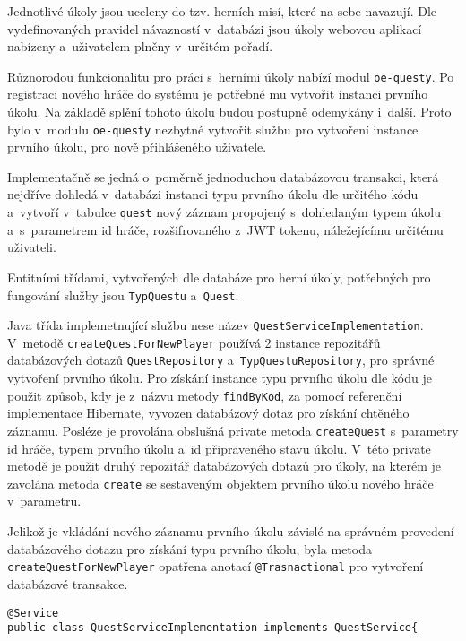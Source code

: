 \documentclass[12pt]{article}
\begin{document}
{Jednotlivé úkoly jsou uceleny do tzv. herních misí, které na sebe navazují. 
Dle vydefinovaných pravidel návazností v~databázi jsou úkoly webovou aplikací nabízeny 
a~uživatelem plněny v~určitém pořadí.

Různorodou funkcionalitu pro práci s~herními úkoly nabízí modul \texttt{oe-questy}.
Po registraci nového hráče do systému je potřebné mu vytvořit instanci prvního úkolu. 
Na základě splění tohoto úkolu budou postupně odemykány i~další. 
Proto bylo v~modulu \texttt{oe-questy} nezbytné vytvořit službu pro vytvoření instance prvního úkolu, 
pro nově přihlášeného uživatele. 

Implementačně se jedná o~poměrně jednoduchou databázovou transakci,
která nejdříve dohledá v~databázi instanci typu prvního úkolu dle určitého kódu a~vytvoří v~tabulce \texttt{quest}
nový záznam propojený s~dohledaným typem úkolu a~s~parametrem id hráče,
rozšifrovaného z~JWT tokenu, náležejícímu určitému uživateli.


Entitními třídami, vytvořených dle databáze pro herní úkoly, 
potřebných pro fungování služby jsou \texttt{TypQuestu} a~\texttt{Quest}.


\obrazek
{}


Java třída implemetnující službu nese název \texttt{QuestServiceImplementation}.
V~metodě \texttt{createQuestForNewPlayer} používá 2 instance repozitářů databázových dotazů
\texttt{QuestRepository} a~\texttt{TypQuestuRepository}, pro správné vytvoření prvního úkolu.
Pro získání instance typu prvního úkolu dle kódu je použit způsob, kdy je z~názvu metody \texttt{findByKod},
za pomocí referenční implementace Hibernate, vyvozen databázový dotaz pro získání chtěného záznamu.
Posléze je provolána obslušná private metoda \texttt{createQuest} s~parametry id hráče, typem prvního úkolu a~id připraveného stavu úkolu.
V~této private metodě je použit druhý repozitář databázových dotazů pro úkoly,
na kterém je zavolána metoda \texttt{create} se sestaveným objektem prvního úkolu nového hráče v~parametru.

Jelikož je vkládání nového záznamu prvního úkolu závislé na správném provedení databázového dotazu pro získání typu prvního úkolu,
byla metoda\texttt{ createQuestForNewPlayer} opatřena anotací \texttt{@Trasnactional} pro vytvoření databázové transakce.

\begin{lstlisting}
@Service
public class QuestServiceImplementation implements QuestService{
    

\end{lstlisting}}
\end{document}
